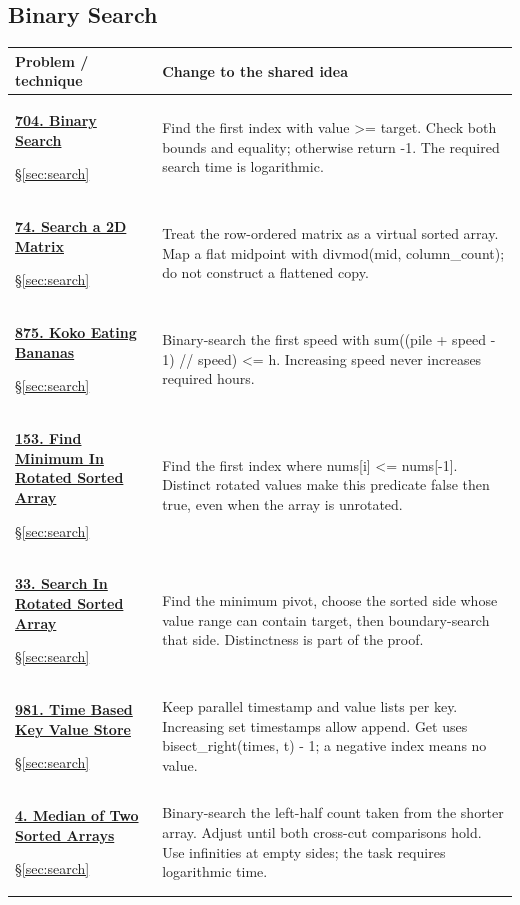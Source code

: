 \documentclass[11pt]{article}
\newcommand{\sect}[1]{\hyperref[sec:#1]{\S\ref*{sec:#1}}}
\begin{document}
\subsection{Binary Search}
\begin{longtable}{@{}L{4.3cm}L{11.7cm}@{}}
\toprule Problem / technique & Change to the shared idea \\ \midrule\endhead
\hypertarget{lc704}{}\href{https://leetcode.com/problems/binary-search/}{\textbf{704. Binary Search}}\par\sect{search} & Find the first index with value >= target. Check both bounds and equality; otherwise return -1. The required search time is logarithmic.\\[4pt]
\hypertarget{lc74}{}\href{https://leetcode.com/problems/search-a-2d-matrix/}{\textbf{74. Search a 2D Matrix}}\par\sect{search} & Treat the row-ordered matrix as a virtual sorted array. Map a flat midpoint with divmod(mid, column\_count); do not construct a flattened copy.\\[4pt]
\hypertarget{lc875}{}\href{https://leetcode.com/problems/koko-eating-bananas/}{\textbf{875. Koko Eating Bananas}}\par\sect{search} & Binary-search the first speed with sum((pile + speed - 1) // speed) <= h. Increasing speed never increases required hours.\\[4pt]
\hypertarget{lc153}{}\href{https://leetcode.com/problems/find-minimum-in-rotated-sorted-array/}{\textbf{153. Find Minimum In Rotated Sorted Array}}\par\sect{search} & Find the first index where nums[i] <= nums[-1]. Distinct rotated values make this predicate false then true, even when the array is unrotated.\\[4pt]
\hypertarget{lc33}{}\href{https://leetcode.com/problems/search-in-rotated-sorted-array/}{\textbf{33. Search In Rotated Sorted Array}}\par\sect{search} & Find the minimum pivot, choose the sorted side whose value range can contain target, then boundary-search that side. Distinctness is part of the proof.\\[4pt]
\hypertarget{lc981}{}\href{https://leetcode.com/problems/time-based-key-value-store/}{\textbf{981. Time Based Key Value Store}}\par\sect{search} & Keep parallel timestamp and value lists per key. Increasing set timestamps allow append. Get uses bisect\_right(times, t) - 1; a negative index means no value.\\[4pt]
\hypertarget{lc4}{}\href{https://leetcode.com/problems/median-of-two-sorted-arrays/}{\textbf{4. Median of Two Sorted Arrays}}\par\sect{search} & Binary-search the left-half count taken from the shorter array. Adjust until both cross-cut comparisons hold. Use infinities at empty sides; the task requires logarithmic time.\\[4pt]
\bottomrule
\end{longtable}
\end{document}
